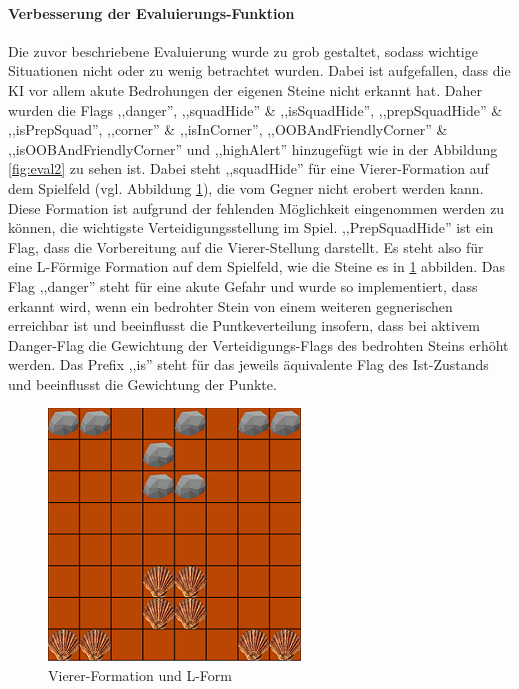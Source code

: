 \paragraph{Verbesserung der Evaluierungs-Funktion}
Die zuvor beschriebene Evaluierung wurde zu grob gestaltet, sodass wichtige Situationen nicht oder zu wenig betrachtet wurden. Dabei ist aufgefallen, dass die KI vor allem akute Bedrohungen der eigenen Steine nicht erkannt hat. Daher wurden die Flags ,,danger'', ,,squadHide'' \& ,,isSquadHide'', ,,prepSquadHide'' \& ,,isPrepSquad'', ,,corner'' \& ,,isInCorner'', ,,OOBAndFriendlyCorner'' \& ,,isOOBAndFriendlyCorner'' und ,,highAlert'' hinzugefügt wie in der Abbildung \ref{fig:eval2} zu sehen ist. Dabei steht ,,squadHide'' für eine Vierer-Formation auf dem Spielfeld (vgl. Abbildung \ref{fig:squad}), die vom Gegner nicht erobert werden kann. Diese Formation ist aufgrund der fehlenden Möglichkeit eingenommen werden zu können, die wichtigste Verteidigungsstellung im Spiel. ,,PrepSquadHide'' ist ein Flag, dass die Vorbereitung auf die Vierer-Stellung darstellt. Es steht also für eine L-Förmige Formation auf dem Spielfeld, wie die Steine es in \ref{fig:squad} abbilden. Das Flag ,,danger'' steht für eine akute Gefahr und wurde so implementiert, dass erkannt wird, wenn ein bedrohter Stein von einem weiteren gegnerischen erreichbar ist und beeinflusst die Puntkeverteilung insofern, dass bei aktivem Danger-Flag die Gewichtung der Verteidigungs-Flags des bedrohten Steins erhöht werden. Das Prefix ,,is'' steht für das jeweils äquivalente Flag des Ist-Zustands und beeinflusst die Gewichtung der Punkte.
\begin{figure}
	\centering
	\includegraphics{img/Squad2}
	\caption{Vierer-Formation und L-Form}
	\label{fig:squad}
\end{figure}
